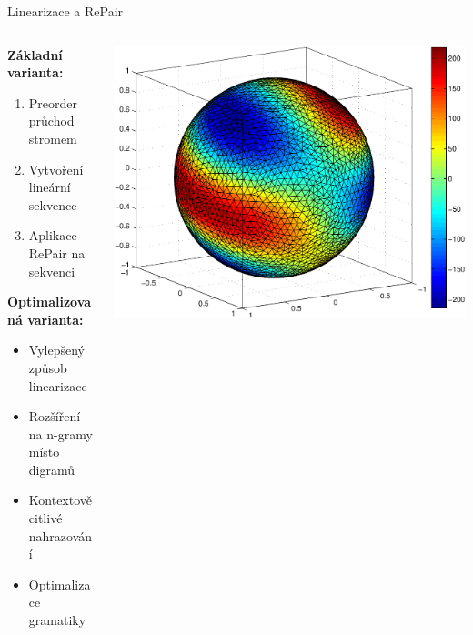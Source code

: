\documentclass[lualatex,hyperref={pdfencoding=auto}]{beamer}
\begin{document}
\begin{frame}{Linearizace a RePair}
  \begin{columns}
    \begin{column}{0.55\textwidth}
      \textbf{Základní varianta:}
      \begin{enumerate}
        \item Preorder průchod stromem
        \item Vytvoření lineární sekvence
        \item Aplikace RePair na sekvenci
      \end{enumerate}
      \vspace{2mm}
      \textbf{Optimalizovaná varianta:}
      \begin{itemize}
        \item Vylepšený způsob linearizace
        \item Rozšíření na n-gramy místo digramů
        \item Kontextově citlivé nahrazování
        \item Optimalizace gramatiky
      \end{itemize}
    \end{column}
    \begin{column}{0.45\textwidth}
      \includegraphics[width=\textwidth]{fig/sphere_mix_real.pdf}
    \end{column}
  \end{columns}
\end{frame}
\end{document}
